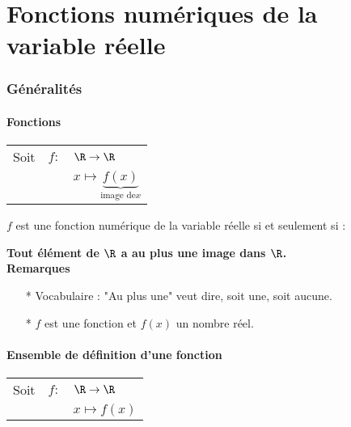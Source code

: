 \vspace*{-.5cm}

\setcounter{section}{0} 

\part{Fonctions numériques de la variable réelle}

\section{Généralités}

\subsection{Fonctions}

\begin{tabular}{lll}
Soit & $f:$ & $ \R \rightarrow \R$ \\
& & $x\mapsto \underbrace{f(x)}_{\textrm{image de} x}$ \\
\end{tabular}

$f$ est une fonction numérique de la variable réelle si et seulement si :

\textbf{Tout élément de $\mathbf{\R}$ a au plus une image dans $\mathbf{\R}$.} \\

\textbf{Remarques}

\begin{itemize}


\item[*]Vocabulaire : "Au plus une" veut dire, soit une, soit aucune. \\ 

\item[*] $f$ est une fonction et $f(x)$ un nombre réel.
\end{itemize}
\subsection{Ensemble de définition d'une fonction}

\begin{tabular}{lll}

Soit & $f:$& $ \R \rightarrow \R$ \\
& & $x\mapsto f(x)$ \\
\end{tabular}

\vspace*{.3cm}

